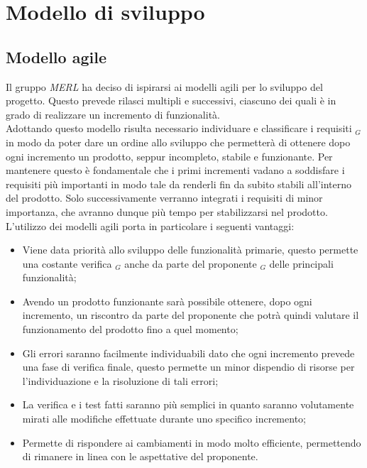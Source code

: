 \chapter{Modello di sviluppo}

\section{Modello agile}
Il gruppo \textit{MERL} ha deciso di ispirarsi ai modelli agili per lo sviluppo del progetto. Questo prevede rilasci multipli e successivi, ciascuno dei quali è in grado di realizzare un incremento di funzionalità.
\\Adottando questo modello risulta necessario individuare e classificare i requisiti $_G$ in modo da poter dare un ordine allo sviluppo che permetterà di ottenere dopo ogni incremento un prodotto, seppur incompleto, stabile e funzionante. Per mantenere questo è fondamentale che i primi incrementi vadano a soddisfare i requisiti più importanti in modo tale da renderli fin da subito stabili all'interno del prodotto. Solo successivamente verranno integrati i requisiti di minor importanza, che avranno dunque più tempo per stabilizzarsi nel prodotto.
\\L'utilizzo dei modelli agili porta in particolare i seguenti vantaggi:
\begin{itemize}
  \item Viene data priorità allo sviluppo delle funzionalità primarie, questo permette una costante verifica $_G$ anche da parte del proponente $_G$ delle principali funzionalità;
  \item Avendo un prodotto funzionante sarà possibile ottenere, dopo ogni incremento, un riscontro da parte del proponente che potrà quindi valutare il funzionamento del prodotto fino a quel momento;
  \item Gli errori saranno facilmente individuabili dato che ogni incremento prevede una fase di verifica finale, questo permette un minor dispendio di risorse per l'individuazione e la risoluzione di tali errori;
  \item La verifica e i test fatti saranno più semplici in quanto saranno volutamente mirati alle modifiche effettuate durante uno specifico incremento;
  \item Permette di rispondere ai cambiamenti in modo molto efficiente, permettendo di rimanere in linea con le aspettative del proponente.
\end{itemize}
